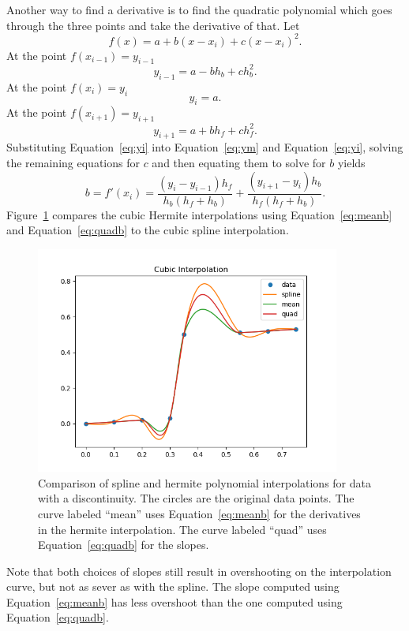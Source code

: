 \documentclass{scrartcl}
\begin{document}
Another way to find a derivative is to find the quadratic polynomial
which goes through the three points and take the derivative of that.
Let
\begin{equation}
f(x)=a+b(x-x_i)+c(x-x_i)^2.
\end{equation}
At the point $f(x_{i-1}) = y_{i-1}$
\begin{equation}
y_{i-1} = a-bh_b+ch_b^2.\label{eq:ym}
\end{equation}
At the point $f(x_i)= y_i$
\begin{equation}
y_i = a. \label{eq:yi}
\end{equation}
At the point $f(x_{i+1}) = y_{i+1}$
\begin{equation}
y_{i+1} = a+bh_f+ch_f^2.\label{eq:yp}
\end{equation}
Substituting Equation~\ref{eq:yi} into Equation~\ref{eq:ym}
and Equation~\ref{eq:yi}, solving the remaining equations for $c$
and then equating them to solve for $b$ yields
\begin{equation}
b = f'(x_i) = \frac{(y_i-y_{i-1})h_f}{h_b(h_f+h_b)}+
	\frac{(y_{i+1}-y_i)h_b}{h_f(h_f+h_b)}.\label{eq:quadb}
\end{equation}
Figure~\ref{fig:hermiteBump} compares the cubic Hermite interpolations
using Equation~\ref{eq:meanb} and Equation~\ref{eq:quadb} to the
cubic spline interpolation.
\begin{figure}
\begin{center}
\includegraphics[width=10cm]{hermiteBump}
\end{center}
\caption{\label{fig:hermiteBump}Comparison of spline and hermite
polynomial interpolations for data with a discontinuity. The circles are
the original data points. The curve labeled ``mean''
uses Equation~\ref{eq:meanb}
for the derivatives in the hermite interpolation. The curve labeled
``quad'' uses Equation~\ref{eq:quadb} for the slopes.}
\end{figure}
Note that both choices of slopes still result in overshooting on the
interpolation curve, but not as sever as with the spline. The slope
computed using Equation~\ref{eq:meanb} has less overshoot than the
one computed using Equation~\ref{eq:quadb}.
\end{document}
